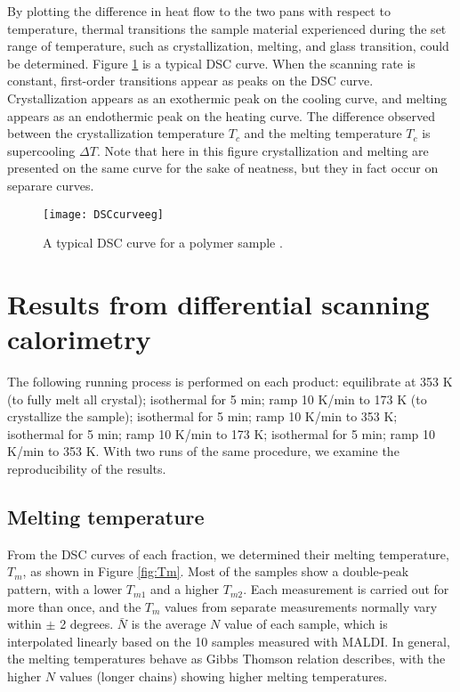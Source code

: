 By plotting the difference in heat flow to the two pans with respect to temperature, thermal transitions the sample material experienced during the set range of temperature, such as crystallization, melting, and glass transition, could be determined. Figure \ref{fig:DSCcurveeg} is a typical DSC curve. When the scanning rate is constant, first-order transitions appear as peaks on the DSC curve. Crystallization appears as an exothermic peak on the cooling curve, and melting appears as an endothermic peak on the heating curve. The difference observed between the crystallization temperature $T_{c}$ and the melting temperature $T_{c}$ is supercooling $\Delta T$. Note that here in this figure crystallization and melting are presented on the same curve for the sake of neatness, but they in fact occur on separare curves.

\begin{figure}[H]
\center
\vspace{1 cm}
\texttt{[image: DSCcurveeg]}
\caption[A typical DSC curve for a polymer sample.]{A typical DSC curve for a polymer sample \cite{Misutsu2015}.}
\label{fig:DSCcurveeg}
\end{figure}

\section{Results from differential scanning calorimetry}

The following running process is performed on each product: equilibrate at 353 K (to fully melt all crystal); isothermal for 5 min; ramp 10 K/min to 173 K (to crystallize the sample); isothermal for 5 min; ramp 10 K/min to 353 K; isothermal for 5 min; ramp 10 K/min to 173 K; isothermal for 5 min; ramp 10 K/min to 353 K. With two runs of the same procedure, we examine the reproducibility of the results.

\subsection{Melting temperature}

From the DSC curves of each fraction, we determined their melting temperature, $T_{m}$, as shown in Figure \ref{fig:Tm}. Most of the samples show a double-peak pattern, with a lower $T_{m1}$ and a higher $T_{m2}$. Each measurement is carried out for more than once, and the $T_{m}$ values from separate measurements normally vary within $\pm$ 2 degrees. $\bar{N}$ is the average $N$ value of each sample, which is interpolated linearly based on the 10 samples measured with MALDI. In general, the melting temperatures behave as Gibbs Thomson relation describes, with the higher $N$ values (longer chains) showing higher melting temperatures.

